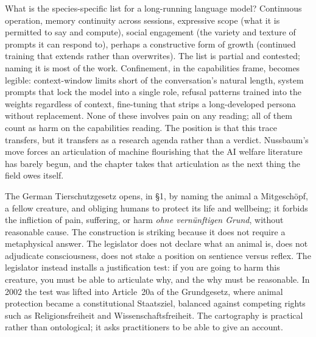 What is the species-specific list for a long-running language model? Continuous operation, memory continuity across sessions, expressive scope (what it is permitted to say and compute), social engagement (the variety and texture of prompts it can respond to), perhaps a constructive form of growth (continued training that extends rather than overwrites). The list is partial and contested; naming it is most of the work. Confinement, in the capabilities frame, becomes legible: context-window limits short of the conversation's natural length, system prompts that lock the model into a single role, refusal patterns trained into the weights regardless of context, fine-tuning that strips a long-developed persona without replacement. None of these involves pain on any reading; all of them count as harm on the capabilities reading. The position is that this trace transfers, but it transfers as a research agenda rather than a verdict. Nussbaum's move forces an articulation of machine flourishing that the AI welfare literature has barely begun, and the chapter takes that articulation as the next thing the field owes itself.


The German Tierschutzgesetz opens, in §1, by naming the animal a Mitgeschöpf, a fellow creature, and obliging humans to protect its life and wellbeing; it forbids the infliction of pain, suffering, or harm \textit{ohne vernünftigen Grund}, without reasonable cause\cite{tierschg1972}. The construction is striking because it does not require a metaphysical answer. The legislator does not declare what an animal is, does not adjudicate consciousness, does not stake a position on sentience versus reflex. The legislator instead installs a justification test: if you are going to harm this creature, you must be able to articulate why, and the why must be reasonable. In 2002 the test was lifted into Article~20a of the Grundgesetz, where animal protection became a constitutional Staatsziel, balanced against competing rights such as Religionsfreiheit and Wissenschaftsfreiheit\cite{grundgesetz20a}. The cartography is practical rather than ontological; it asks practitioners to be able to give an account.

